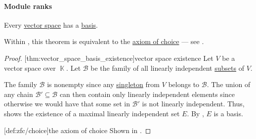 \paragraph{Module ranks}

\begin{theorem}\label{thm:vector_space_basis_existence}
  Every \hyperref[def:vector_space]{vector space} has a \hyperref[def:hamel_basis]{basis}.
\end{theorem}
\begin{comments}
  \item Within \hyperref[def:zfc]{}, this theorem is equivalent to the \hyperref[def:zfc/choice]{axiom of choice} --- see .
\end{comments}
\begin{proof}
  [thm:vector_space_basis_existence]{vector space existence} Let \( V \) be a vector space over \( \BbbK \). Let \( \mathcal{B} \) be the family of all linearly independent \hyperref[def:linear_combination]{subsets} of \( V \).

  The family \( \mathcal{B} \) is nonempty since any \hyperref[def:singleton_set]{singleton} from \( V \) belongs to \( \mathcal{B} \). The union of any chain \( \mathcal{B}' \subseteq \mathcal{B} \) can then contain only linearly independent elements since otherwise we would have that some set in \( \mathcal{B}' \) is not linearly independent. Thus,  shows the existence of a maximal linearly independent set \( E \). By , \( E \) is a basis.

  [def:zfc/choice]{the axiom of choice} Shown in \cite{Blass1984BasesImplyAOC}.
\end{proof}

